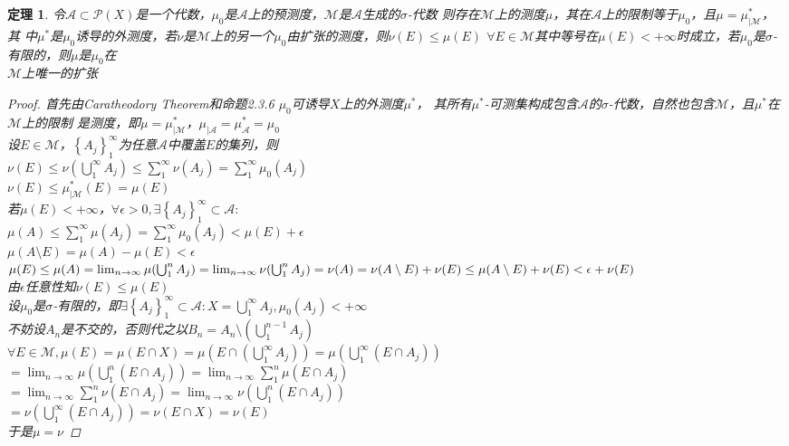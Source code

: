 \documentclass[12pt, a4paper, oneside]{ctexbook}
\newtheorem{theorem}{定理}[section]
\begin{document}
\begin{theorem}
    令$\mathcal{A}\subset\mathcal{P}(X)$是一个代数，$\mu_0$是$\mathcal{A}$上的预测度，$\mathcal{M}$是$\mathcal{A}$生成的$\sigma$-代数
    则存在$\mathcal{M}$上的测度$\mu$，其在$\mathcal{A}$上的限制等于$\mu_0$，且$\mu=\mu^*_{|\mathcal{M}}$，其
    中$\mu^*$是$\mu_0$诱导的外测度，若$\nu $是$\mathcal{M}$上的另一个$\mu_0$由扩张的测度，则$\nu(E)\leq\mu(E)$
    $\forall E\in\mathcal{M}$其中等号在$\mu(E)<+\infty$时成立，若$\mu_0$是$\sigma$-有限的，则$\mu$是$\mu_0$在\\
    $\mathcal{M}$上唯一的扩张
    \begin{proof}
        首先由Caratheodory Theorem和命题2.3.6 $\mu_0$可诱导$X$上的外测度$\mu^*$，
        其所有$\mu^*$-可测集构成包含$\mathcal{A}$的$\sigma$-代数，自然也包含$\mathcal{M}$，且$\mu^*$在$\mathcal{M}$上的限制
        是测度，即$\mu=\mu_{|\mathcal{M}}^*$，$\mu_{|\mathcal{A}}=\mu^*_{\mathcal{A}}=\mu_0$\\
        设$E\in\mathcal{M}$，$\left\{A_j\right\}_1^{\infty}$为任意$\mathcal{A}$中覆盖$E$的集列，则\\
        $\nu(E)\leq\nu(\bigcup_1^{\infty}A_j)\leq\sum_1^{\infty}\nu(A_j)=\sum_1^{\infty}\mu_0(A_j)$\\
        $\nu(E)\leq\mu^*_{|\mathcal{M}}(E)=\mu(E)$\\
        若$\mu(E)<+\infty$，$\forall\epsilon>0,\exists\left\{A_j\right\}_1^{\infty}\subset\mathcal{A}:$\\
        $\mu(A)\leq\sum_1^{\infty}\mu(A_j)=\sum_1^{\infty}\mu_0(A_j)<\mu(E)+\epsilon$\\
        $\mu(A\setminus E)=\mu(A)-\mu(E)<\epsilon$\\
        $\mu(E)\leq\mu(A)=\lim_{n \to \infty}\mu(\bigcup_1^nA_j)=\lim_{n \to \infty}\nu(\bigcup_1^nA_j)\\
        =\nu(A)=\nu(A\setminus E)+\nu(E)\leq\mu(A\setminus E)+\nu(E)<\epsilon+\nu(E)$\\
        由$\epsilon$任意性知$\nu(E)\leq\mu(E)$\\
        设$\mu_0$是$\sigma$-有限的，即$\exists\left\{A_j\right\}_1^{\infty}\subset\mathcal{A}:X=\bigcup_1^{\infty}A_j,\mu_0(A_j)<+\infty$\\
        不妨设$A_n$是不交的，否则代之以$B_n=A_n\setminus(\bigcup_1^{n-1}A_j)$\\
        $\forall E\in\mathcal{M},\mu(E)=\mu(E\cap X)=\mu(E\cap(\bigcup_1^{\infty}A_j))=\mu(\bigcup_1^{\infty}(E\cap A_j))$\\
        $=\lim_{n\to\infty}\mu(\bigcup_1^n(E\cap A_j))=\lim_{n\to\infty}\sum_1^n\mu(E\cap A_j)$\\
        $=\lim_{n\to\infty}\sum_1^n\nu(E\cap A_j)=\lim_{n\to\infty}\nu(\bigcup_1^n(E\cap A_j))$\\
        $=\nu(\bigcup_1^{\infty}(E\cap A_j))=\nu(E\cap X)=\nu(E)$\\
        于是$\mu=\nu$
    \end{proof}
\end{theorem}
\end{document}
